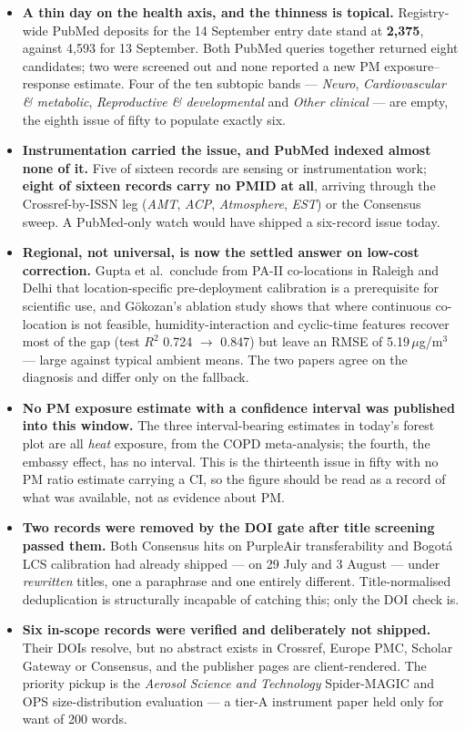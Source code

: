 \documentclass[10pt]{article}
\begin{document}
\footnotesize
\begin{itemize}
\item \textbf{A thin day on the health axis, and the thinness is topical.} Registry-wide
PubMed deposits for the 14 September entry date stand at \textbf{2{,}375}, against 4{,}593
for 13 September. Both PubMed queries together returned eight candidates; two were
screened out and none reported a new PM exposure--response estimate. Four of the ten
subtopic bands --- \textit{Neuro}, \textit{Cardiovascular \& metabolic},
\textit{Reproductive \& developmental} and \textit{Other clinical} --- are empty, the
eighth issue of fifty to populate exactly six.

\item \textbf{Instrumentation carried the issue, and PubMed indexed almost none of it.}
Five of sixteen records are sensing or instrumentation work; \textbf{eight of sixteen
records carry no PMID at all}, arriving through the Crossref-by-ISSN leg
(\textit{AMT}, \textit{ACP}, \textit{Atmosphere}, \textit{EST}) or the Consensus sweep.
A PubMed-only watch would have shipped a six-record issue today.

\item \textbf{Regional, not universal, is now the settled answer on low-cost correction.}
Gupta et al.\ conclude from PA-II co-locations in Raleigh and Delhi that
location-specific pre-deployment calibration is a prerequisite for scientific use, and
G\"okozan's ablation study shows that where continuous co-location is not feasible,
humidity-interaction and cyclic-time features recover most of the gap
(test $R^2$ 0.724 $\to$ 0.847) but leave an RMSE of 5.19\,$\mu$g/m$^3$ --- large against
typical ambient means. The two papers agree on the diagnosis and differ only on the
fallback.

\item \textbf{No PM exposure estimate with a confidence interval was published into this
window.} The three interval-bearing estimates in today's forest plot are all
\emph{heat} exposure, from the COPD meta-analysis; the fourth, the embassy effect, has
no interval. This is the thirteenth issue in fifty with no PM ratio estimate carrying a
CI, so the figure should be read as a record of what was available, not as evidence
about PM.

\item \textbf{Two records were removed by the DOI gate after title screening passed
them.} Both Consensus hits on PurpleAir transferability and Bogot\'a LCS calibration had
already shipped --- on 29 July and 3 August --- under \emph{rewritten} titles, one a
paraphrase and one entirely different. Title-normalised deduplication is structurally
incapable of catching this; only the DOI check is.

\item \textbf{Six in-scope records were verified and deliberately not shipped.} Their
DOIs resolve, but no abstract exists in Crossref, Europe PMC, Scholar Gateway or
Consensus, and the publisher pages are client-rendered. The priority pickup is the
\textit{Aerosol Science and Technology} Spider-MAGIC and OPS size-distribution
evaluation --- a tier-A instrument paper held only for want of 200 words.
\end{itemize}
\end{document}
